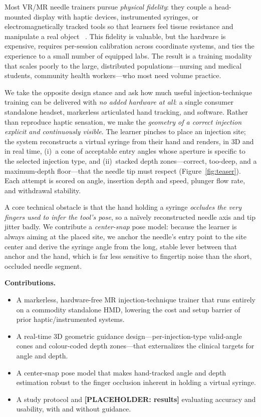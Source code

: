 \documentclass[sigconf]{acmart}
\begin{document}
Most VR/MR needle trainers pursue \emph{physical fidelity}: they couple a head-mounted display
with haptic devices, instrumented syringes, or electromagnetically tracked tools so that learners
feel tissue resistance and manipulate a real object
~\cite{kim2023bimanual,guruge2025acupuncture,yang2026multimodal}. This fidelity is valuable, but
the hardware is expensive, requires per-session calibration across coordinate systems, and ties
the experience to a small number of equipped labs. The result is a training modality that scales
poorly to the large, distributed populations---nursing and medical students, community health
workers---who most need volume practice.

We take the opposite design stance and ask how much useful injection-technique training can be
delivered with \emph{no added hardware at all}: a single consumer standalone headset, markerless
articulated hand tracking, and software. Rather than reproduce haptic sensation, we make the
\emph{geometry of a correct injection explicit and continuously visible}. The learner pinches to
place an injection site; the system reconstructs a virtual syringe from their hand and renders, in
3D and in real time, (i)~a cone of acceptable entry angles whose aperture is specific to the
selected injection type, and (ii)~stacked depth zones---correct, too-deep, and a maximum-depth
floor---that the needle tip must respect (Figure~\ref{fig:teaser}). Each attempt is scored on
angle, insertion depth and speed, plunger flow rate, and withdrawal stability.

A core technical obstacle is that the hand holding a syringe \emph{occludes the very fingers used
to infer the tool's pose}, so a na\"ively reconstructed needle axis and tip jitter badly. We
contribute a \emph{center-snap} pose model: because the learner is always aiming at the placed
site, we anchor the needle's entry point to the site center and derive the syringe angle from the
long, stable lever between that anchor and the hand, which is far less sensitive to fingertip
noise than the short, occluded needle segment.

\medskip\noindent\textbf{Contributions.}
\begin{itemize}
  \item A markerless, hardware-free MR injection-technique trainer that runs entirely on a
  commodity standalone HMD, lowering the cost and setup barrier of prior haptic/instrumented
  systems.
  \item A real-time 3D geometric guidance design---per-injection-type valid-angle cones and
  colour-coded depth zones---that externalizes the clinical targets for angle and depth.
  \item A center-snap pose model that makes hand-tracked angle and depth estimation robust to the
  finger occlusion inherent in holding a virtual syringe.
  \item A study protocol and \textbf{[PLACEHOLDER: results]} evaluating accuracy and usability,
  with and without guidance.
\end{itemize}
\end{document}
